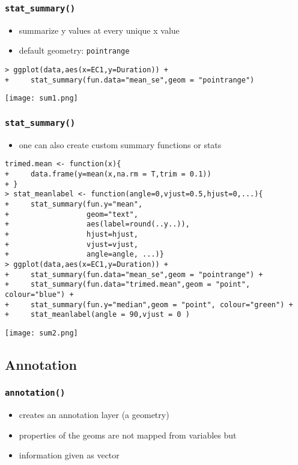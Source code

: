 \begin{frame}\frametitle{\texttt{stat\_summary()}}
  \begin{itemize}
  \item summarize y values at every unique x value
  \item default geometry: \texttt{pointrange}
  \end{itemize}
\small
\begin{verbatim}
> ggplot(data,aes(x=EC1,y=Duration)) +
+     stat_summary(fun.data="mean_se",geom = "pointrange")
\end{verbatim}
\begin{center}
  \texttt{[image: sum1.png]}
\end{center}
\end{frame}


\begin{frame}\frametitle{\texttt{stat\_summary()}}
  \begin{itemize}
  \item one can also create custom summary functions or stats
  \end{itemize}
\footnotesize
\begin{verbatim}
trimed.mean <- function(x){
+     data.frame(y=mean(x,na.rm = T,trim = 0.1))
+ }
> stat_meanlabel <- function(angle=0,vjust=0.5,hjust=0,...){
+     stat_summary(fun.y="mean",
+                  geom="text",
+                  aes(label=round(..y..)),
+                  hjust=hjust,
+                  vjust=vjust,
+                  angle=angle, ...)}
> ggplot(data,aes(x=EC1,y=Duration)) +
+     stat_summary(fun.data="mean_se",geom = "pointrange") +
+     stat_summary(fun.data="trimed.mean",geom = "point", colour="blue") +
+     stat_summary(fun.y="median",geom = "point", colour="green") +
+     stat_meanlabel(angle = 90,vjust = 0 )
\end{verbatim}
\begin{center}
  \texttt{[image: sum2.png]}
\end{center}
\end{frame}

\subsection{Annotation}
\begin{frame}\frametitle{\texttt{annotation()}}
  \begin{itemize}
  \item creates an annotation layer (a geometry)
  \item properties of the geoms are not mapped from variables but
  \item information given as vector
  \end{itemize}
\end{frame}

